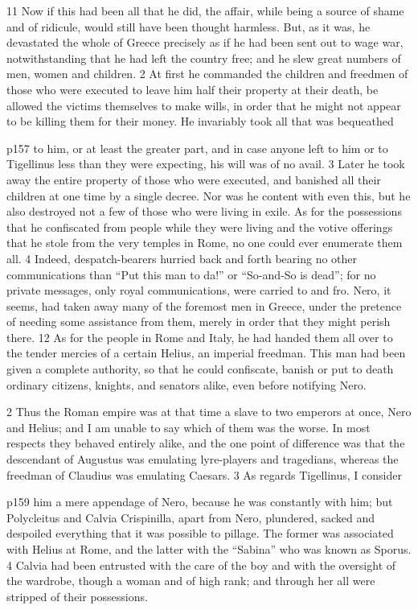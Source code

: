 11
Now if this had been all that he did, the affair, while being a source of shame and of ridicule, would still have been thought harmless. But, as it was, he devastated the whole of Greece precisely as if he had been sent out to wage war, notwithstanding that he had left the country free; and he slew great numbers of men, women and children. 2 At first he commanded the children and freedmen of those who were executed to leave him half their property at their death, be allowed the victims themselves to make wills, in order that he might not appear to be killing them for their money. He invariably took all that was bequeathed

p157 to him, or at least the greater part, and in case anyone left to him or to Tigellinus less than they were expecting, his will was of no avail. 3 Later he took away the entire property of those who were executed, and banished all their children at one time by a single decree. Nor was he content with even this, but he also destroyed not a few of those who were living in exile. As for the possessions that he confiscated from people while they were living and the votive offerings that he stole from the very temples in Rome, no one could ever enumerate them all. 4 Indeed, despatch-bearers hurried back and forth bearing no other communications than ``Put this man to da!'' or ``So-and\texthebrew{‑}So is dead''; for no private messages, only royal communications, were carried to and fro. Nero, it seems, had taken away many of the foremost men in Greece, under the pretence of needing some assistance from them, merely in order that they might perish there. 12 As for the people in Rome and Italy, he had handed them all over to the tender mercies of a certain Helius, an imperial freedman. This man had been given a complete authority, so that he could confiscate, banish or put to death ordinary citizens, knights, and senators alike, even before notifying Nero.

2
Thus the Roman empire was at that time a slave to two emperors at once, Nero and Helius; and I am unable to say which of them was the worse. In most respects they behaved entirely alike, and the one point of difference was that the descendant of Augustus was emulating lyre-players and tragedians, whereas the freedman of Claudius was emulating Caesars. 3 As regards Tigellinus, I consider

p159 him a mere appendage of Nero, because he was constantly with him; but Polycleitus and Calvia Crispinilla, apart from Nero, plundered, sacked and despoiled everything that it was possible to pillage. The former was associated with Helius at Rome, and the latter with the ``Sabina'' who was known as Sporus. 4 Calvia had been entrusted with the care of the boy and with the oversight of the wardrobe, though a woman and of high rank; and through her all were stripped of their possessions.

